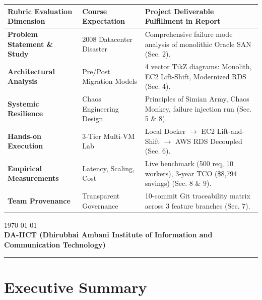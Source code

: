 \documentclass[11pt,a4paper]{article}
\begin{document}
\begin{titlepage}
    \vspace{1.5cm}
    
    \begin{table}[htbp]
    \centering
    \small
    \begin{tabularx}{\textwidth}{p{4.2cm}p{3.8cm}X}
    \toprule
    \textbf{Rubric Evaluation Dimension} & \textbf{Course Expectation} & \textbf{Project Deliverable Fulfillment in Report} \\
    \midrule
    \textbf{Problem Statement \& Study} & 2008 Datacenter Disaster & Comprehensive failure mode analysis of monolithic Oracle SAN (Sec. 2). \\
    \textbf{Architectural Analysis} & Pre/Post Migration Models & 4 vector TikZ diagrams: Monolith, EC2 Lift-Shift, Modernized RDS (Sec. 4). \\
    \textbf{Systemic Resilience} & Chaos Engineering Design & Principles of Simian Army, Chaos Monkey, failure injection run (Sec. 5 \& 8). \\
    \textbf{Hands-on Execution} & 3-Tier Multi-VM Lab & Local Docker $\rightarrow$ EC2 Lift-and-Shift $\rightarrow$ AWS RDS Decoupled (Sec. 6). \\
    \textbf{Empirical Measurements} & Latency, Scaling, Cost & Live benchmark (500 req, 10 workers), 3-year TCO (\$8,794 savings) (Sec. 8 \& 9). \\
    \textbf{Team Provenance} & Transparent Governance & 10-commit Git traceability matrix across 3 feature branches (Sec. 7). \\
    \bottomrule
    \end{tabularx}
    \end{table}

    \vfill
    {\large \today}\\[0.2cm]
    \textbf{DA-IICT (Dhirubhai Ambani Institute of Information and Communication Technology)}
\end{titlepage}

\newpage

\tableofcontents
\vspace{0.6cm}
\hrule
\vspace{0.6cm}

\section*{Executive Summary}
\end{document}

